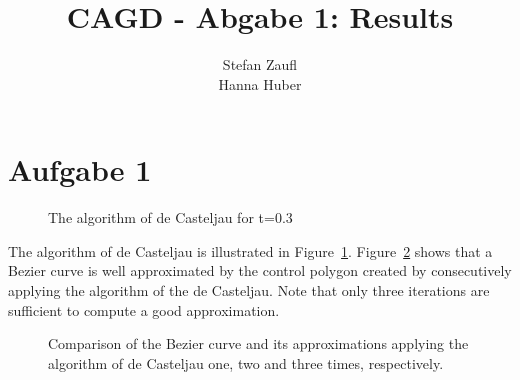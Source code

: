 \documentclass[12pt]{article}
\title{CAGD - Abgabe 1: Results}
\author{Stefan Zaufl \\ Hanna Huber}
\begin{document}
\maketitle

\section{Aufgabe 1}

\begin{figure}
\caption{The algorithm of de Casteljau for t=0.3}
\label{fig:1a}
\end{figure}

The algorithm of de Casteljau is illustrated in Figure~\ref{fig:1a}. Figure~\ref{fig:1b} shows that a Bezier curve is well approximated by the control polygon created by consecutively applying the algorithm of the de Casteljau. Note that only three iterations are sufficient to compute a good approximation.

\begin{figure}
\caption{Comparison of the Bezier curve and its approximations applying the algorithm of de Casteljau one, two and three times, respectively.}
\label{fig:1b}
\end{figure}
\end{document}
